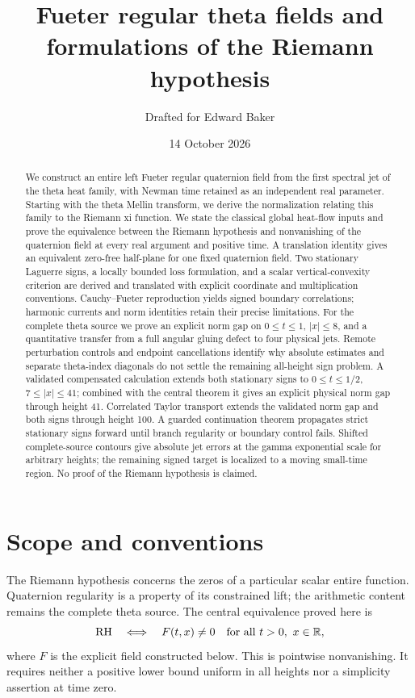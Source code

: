 \documentclass[11pt]{article}
\title{Fueter regular theta fields and formulations of the Riemann hypothesis}
\author{Drafted for Edward Baker}
\date{14 October 2026}
\numberwithin{equation}{section}
\theoremstyle{definition}
\theoremstyle{remark}
\newcommand{\R}{\mathbb R}
\newcommand{\RH}{\mathrm{RH}}
\begin{document}
\maketitle
\begin{abstract}
We construct an entire left Fueter regular quaternion field from the first
spectral jet of the theta heat family, with Newman time retained as an
independent real parameter. Starting with the theta Mellin transform, we
derive the normalization relating this family to the Riemann xi function.
We state the classical global heat-flow inputs and prove the equivalence
between the Riemann hypothesis and nonvanishing of the quaternion field
at every real argument and positive time. A translation identity gives
an equivalent zero-free half-plane for one fixed quaternion field.
Two stationary Laguerre signs, a locally bounded loss formulation, and
a scalar vertical-convexity criterion are derived and translated with
explicit coordinate and multiplication conventions. Cauchy--Fueter
reproduction yields signed boundary correlations; harmonic currents and
norm identities retain their precise limitations. For the complete theta
source we prove an explicit norm gap on $0\le t\le1$, $|x|\le8$, and a
quantitative transfer from a full angular gluing defect to four physical
jets. Remote perturbation controls and endpoint cancellations identify
why absolute estimates and separate theta-index diagonals do not settle
the remaining all-height sign problem. A validated compensated calculation
extends both stationary signs to $0\le t\le1/2$, $7\le|x|\le41$;
combined with the central theorem it gives an explicit physical norm gap
through height 41. Correlated Taylor transport extends the validated
norm gap and both signs through height 100. A guarded continuation theorem propagates strict
stationary signs forward until branch regularity or boundary control
fails. Shifted complete-source contours give absolute jet errors at the
gamma exponential scale for arbitrary heights; the remaining signed
target is localized to a moving small-time region. No proof of the Riemann hypothesis
is claimed.
\end{abstract}
\tableofcontents

\section{Scope and conventions}\label{sec:scope}
The Riemann hypothesis concerns the zeros of a particular scalar entire
function. Quaternion regularity is a property of its constrained lift;
the arithmetic content remains the complete theta source. The central
equivalence proved here is
\[
 \RH\quad\Longleftrightarrow\quad
 F(t,x)\ne0\quad\hbox{for all }t>0,\ x\in\R,
\]
where $F$ is the explicit field constructed below. This is pointwise
nonvanishing. It requires neither a positive lower bound uniform in all
heights nor a simplicity assertion at time zero.
\end{document}
